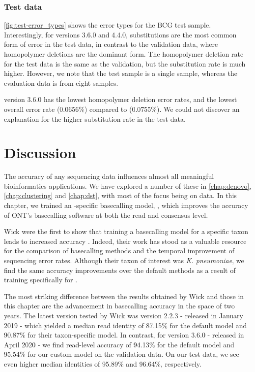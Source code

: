 \subsubsection{Test data}

\autoref{fig:test-error_types} shows the error types for the BCG test sample. Interestingly, for versions 3.6.0 and 4.4.0, substitutions are the most common form of error in the test data, in contrast to the validation data, where homopolymer deletions are the dominant form. The homopolymer deletion rate for the test data is the same as the validation, but the substitution rate is much higher. However, we note that the test sample is a single sample, whereas the evaluation data is from eight samples.

\tubby{} version 3.6.0 has the lowest homopolymer deletion error rates, and the lowest overall error rate (0.0656\%) compared to \guppy{} (0.0755\%). We could not discover an explanation for the higher substitution rate in the test data.

\section{Discussion}

The accuracy of any sequencing data influences almost all meaningful bioinformatics applications. We have explored a number of these in \autoref{chap:denovo}, \autoref{chap:clustering} and \autoref{chap:dst}, with most of the focus being on \ont{} data. In this chapter, we trained an \mtb{}-specific \ont{} basecalling model, \tubby{}, which improves the accuracy of ONT's basecalling software \guppy{} at both the read and consensus level.

Wick \etal{} were the first to show that training a \ont{} basecalling model for a specific taxon leads to increased accuracy \cite{wick2019}. Indeed, their work has stood as a valuable resource for the comparison of basecalling methods and the temporal improvement of \ont{} sequencing error rates. Although their taxon of interest was \textit{K. pneumoniae}, we find the same accuracy improvements over the default methods as a result of training specifically for \mtb{}.

The most striking difference between the results obtained by Wick \etal{} and those in this chapter are the advancement in basecalling accuracy in the space of two years. The latest \guppy{} version tested by Wick \etal{} was version 2.2.3 - released in January 2019 - which yielded a median read identity of 87.15\% for the default model and 90.87\% for their taxon-specific model. In contrast, for \guppy{} version 3.6.0 - released in April 2020 - we find read-level accuracy of 94.13\% for the default model and 95.54\% for our custom \tubby{} model on the validation data. On our test data, we see even higher median identities of 95.89\% and 96.64\%, respectively.

